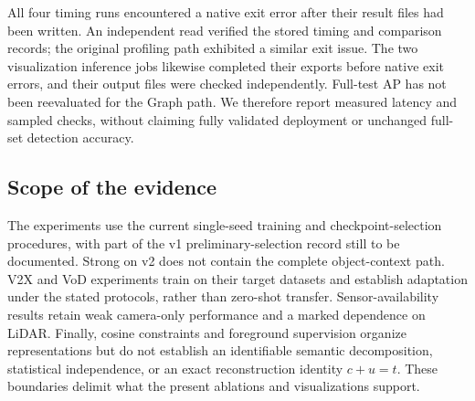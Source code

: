 All four timing runs encountered a native exit error after their result files had been written. An independent read verified the stored timing and comparison records; the original profiling path exhibited a similar exit issue. The two visualization inference jobs likewise completed their exports before native exit errors, and their output files were checked independently. Full-test AP has not been reevaluated for the Graph path. We therefore report measured latency and sampled checks, without claiming fully validated deployment or unchanged full-set detection accuracy.

\subsection{Scope of the evidence}
\label{subsec:h3}

The experiments use the current single-seed training and checkpoint-selection procedures, with part of the v1 preliminary-selection record still to be documented. Strong on v2 does not contain the complete object-context path. V2X and VoD experiments train on their target datasets and establish adaptation under the stated protocols, rather than zero-shot transfer. Sensor-availability results retain weak camera-only performance and a marked dependence on LiDAR. Finally, cosine constraints and foreground supervision organize representations but do not establish an identifiable semantic decomposition, statistical independence, or an exact reconstruction identity \(c+u=t\). These boundaries delimit what the present ablations and visualizations support.



